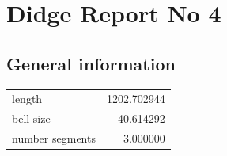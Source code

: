 \documentclass{article}
\begin{document}
\begin{centering}
\begin{figure}[!htb]
\end{figure}
\end{centering}
\section{Didge Report No 4}

\subsection{General information}
\begin{centering}

\begin{figure}[!htb]
\end{figure}
\begin{tabular}{lr}
\toprule
         length & 1202.702944 \\
      bell size &   40.614292 \\
number segments &    3.000000 \\
\bottomrule
\end{tabular}
\end{centering}
\end{document}
